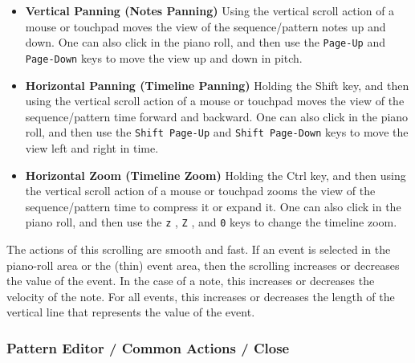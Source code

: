    \begin{itemize}
      \item \textbf{Vertical Panning (Notes Panning)}
         Using the vertical scroll action of a mouse or touchpad moves the
         view of the sequence/pattern notes up and down.
         One can also click in the piano roll, and then use the
         \texttt{Page-Up} 
         and \texttt{Page-Down} 
         keys to move the view up and down in pitch.
      \item \textbf{Horizontal Panning (Timeline Panning)}
         Holding the Shift key, and then using the vertical scroll action of a
         mouse or touchpad moves the view of the sequence/pattern time forward
         and backward.
         One can also click in the piano roll, and then use the
         \texttt{Shift Page-Up} 
         and \texttt{Shift Page-Down} 
         keys to move the view left and right in time.
      \item \textbf{Horizontal Zoom (Timeline Zoom)}
         Holding the Ctrl key, and then using the vertical scroll action of a
         mouse or touchpad zooms the view of the sequence/pattern time to
         compress it or expand it.
         One can also click in the piano roll, and then use the
         \texttt{z} ,
         \texttt{Z} , and
         \texttt{0}  keys to change the timeline zoom.
   \end{itemize}

   The actions of this scrolling are smooth and fast.
   If an event is selected in the piano-roll area or the (thin) event area,
   then the scrolling increases or decreases the value of the event.
   In the case of a note, this increases or decreases the velocity of the note.
   For all events, this increases or decreases the length of the vertical line
   that represents the value of the event.

\subsubsection{Pattern Editor / Common Actions / Close}
\label{subsec:pattern_editor_close}

